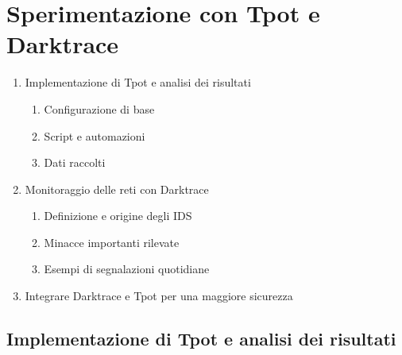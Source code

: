 \chapter{Sperimentazione con Tpot e Darktrace}
\begin{enumerate}
	\item Implementazione di Tpot e analisi dei risultati
	\begin{enumerate}
		\item Configurazione di base
		\item Script e automazioni
		\item Dati raccolti
	\end{enumerate}
	\item Monitoraggio delle reti con Darktrace
	\begin{enumerate}
		\item Definizione e origine degli IDS
		\item Minacce importanti rilevate
		\item Esempi di segnalazioni quotidiane
	\end{enumerate}
	\item Integrare Darktrace e Tpot per una maggiore sicurezza
\end{enumerate}
\section{Implementazione di Tpot e analisi dei risultati}
